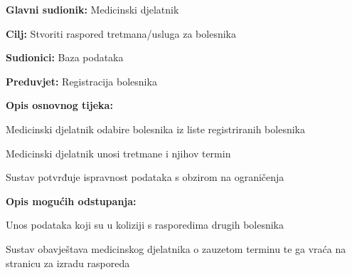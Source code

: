 			
			\noindent {}
			\begin{packed_item}
				
				\item \textbf{Glavni sudionik: }Medicinski djelatnik
				\item  \textbf{Cilj:} Stvoriti raspored tretmana/usluga za bolesnika
				\item  \textbf{Sudionici:} Baza podataka
				\item  \textbf{Preduvjet:} Registracija bolesnika
				\item  \textbf{Opis osnovnog tijeka:}
				
				
				\item[] \begin{packed_enum}
					
					\item Medicinski djelatnik odabire bolesnika iz liste registriranih bolesnika
					\item Medicinski djelatnik unosi tretmane i njihov termin
					\item Sustav potvrđuje ispravnost podataka s obzirom na ograničenja
					
				\end{packed_enum}
				
				\item  \textbf{Opis mogućih odstupanja:}
				\item[2.a] Unos podataka koji su u koliziji s rasporedima drugih bolesnika
				\item[] \begin{packed_enum}
					
					\item Sustav obavještava medicinskog djelatnika o zauzetom terminu te ga vraća na stranicu za izradu rasporeda
					
					
					
				\end{packed_enum}
			\end{packed_item}
		
